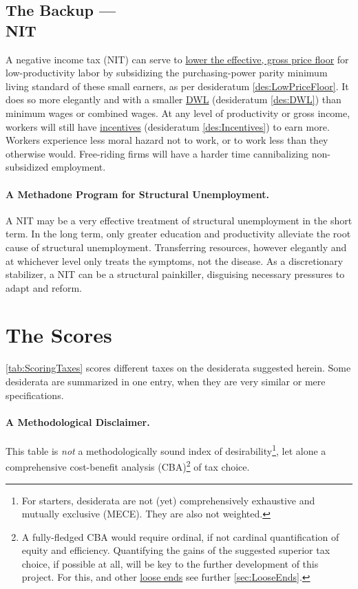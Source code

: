 \subsection[Negative Income Tax]{The Backup ---\\NIT} \label{sec:ScoreNIT} A negative income tax (NIT) can serve to \hyperref[des:LowPriceFloor]{lower the effective, gross price floor} for low-productivity labor by subsidizing the purchasing-power parity minimum living standard of these small earners, as per desideratum \ref{des:LowPriceFloor}. It does so more elegantly and with a smaller \hyperref[des:DWL]{DWL} (desideratum \ref{des:DWL}) than minimum wages or combined wages. At any level of productivity or gross income, workers will still have \hyperref[des:Incentives]{incentives} (desideratum \ref{des:Incentives}) to earn more. Workers experience less moral hazard not to work, or to work less than they otherwise would. Free-riding firms will have a harder time cannibalizing non-subsidized employment.

\paragraph{A Methadone Program for Structural Unemployment.} A NIT may be a very effective treatment of structural unemployment in the short term. In the long term, only greater education and productivity alleviate the root cause of structural unemployment. Transferring resources, however elegantly and at whichever level only treats the symptoms, not the disease. As a discretionary stabilizer, a NIT can be a structural painkiller, disguising necessary pressures to adapt and reform.
\clearpage

\section{The Scores} \label{sec:Scores}

\autoref{tab:ScoringTaxes} scores different taxes on the desiderata suggested herein. Some desiderata are summarized in one entry, when they are very similar or mere specifications.

\paragraph{A Methodological Disclaimer.} This table is \emph{not} a methodologically sound index of desirability\footnote{For starters, desiderata are not (yet) comprehensively exhaustive and mutually exclusive (MECE). They are also not weighted.}, let alone a comprehensive cost-benefit analysis (CBA)\footnote{
	A fully-fledged CBA would require ordinal, if not cardinal quantification of equity and efficiency. Quantifying the gains of the suggested superior tax choice, if possible at all, will be key to the further development of this project. For this, and other \hyperref[sec:LooseEnds]{loose ends} see further \autoref{sec:LooseEnds}.}
of tax choice.

